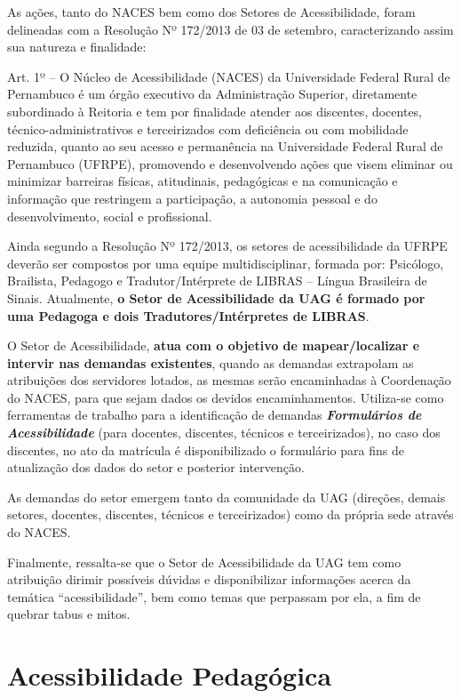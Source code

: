 \documentclass[
	12pt,				%
	openright,			%
  oneside,     %
	a4paper,			%
	chapter=TITLE,		%
	english,			%
	french,				%
	spanish,			%
	brazil				%
	]{abntex2}
\begin{document}
As ações, tanto do NACES bem como dos Setores de Acessibilidade, foram delineadas com a Resolução Nº 172/2013 de 03 de setembro, caracterizando assim sua natureza e finalidade:

\begin{citacao}
    Art. 1º – O Núcleo de Acessibilidade (NACES) da Universidade Federal Rural de Pernambuco é um órgão executivo da Administração Superior, diretamente subordinado à Reitoria e tem por finalidade atender aos discentes, docentes, técnico-administrativos e terceirizados com deficiência ou com mobilidade reduzida, quanto ao seu acesso e permanência na Universidade Federal Rural de Pernambuco (UFRPE), promovendo e desenvolvendo ações que visem eliminar ou minimizar barreiras físicas, atitudinais, pedagógicas e na comunicação e informação que restringem a participação, a autonomia pessoal e do desenvolvimento, social e profissional.
\end{citacao}

Ainda segundo a Resolução Nº 172/2013, os setores de acessibilidade da UFRPE deverão ser compostos por uma equipe multidisciplinar, formada por: Psicólogo, Brailista, Pedagogo e Tradutor/Intérprete de LIBRAS – Língua Brasileira de Sinais. Atualmente, \textbf{o Setor de Acessibilidade da UAG é formado por uma Pedagoga e dois Tradutores/Intérpretes de LIBRAS}.

O Setor de Acessibilidade, \textbf{atua com o objetivo de mapear/localizar e intervir nas demandas existentes}, quando as demandas extrapolam as atribuições dos servidores lotados, as mesmas serão encaminhadas à Coordenação do NACES, para que sejam dados os devidos encaminhamentos. Utiliza-se como ferramentas de trabalho para a identificação de demandas {\bfseries \textit{Formulários de Acessibilidade}} (para docentes, discentes, técnicos e terceirizados), no caso dos discentes, no ato da matrícula é disponibilizado o formulário para fins de atualização dos dados do setor e posterior intervenção.

As demandas do setor emergem tanto da comunidade da UAG (direções, demais setores, docentes, discentes, técnicos e terceirizados) como da própria sede através do NACES.

Finalmente, ressalta-se que o Setor de Acessibilidade da UAG tem como atribuição dirimir possíveis dúvidas e disponibilizar informações acerca da temática “acessibilidade”, bem como temas que perpassam por ela, a fim de quebrar tabus e mitos.

\section{Acessibilidade Pedagógica}
\end{document}
